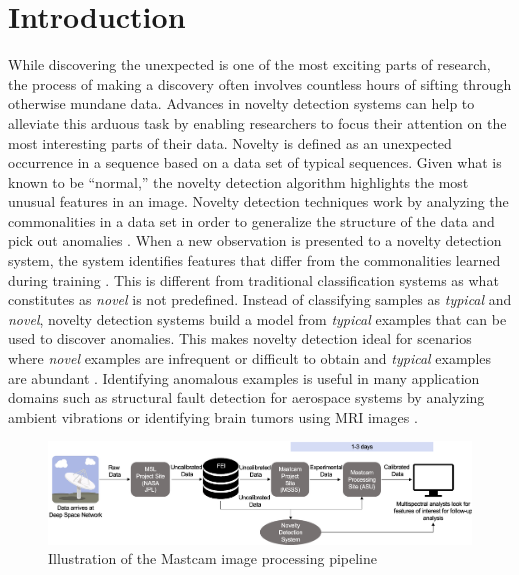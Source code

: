 \section{Introduction}
While discovering the unexpected is one of the most exciting parts of research, the process of making a discovery often involves countless hours of sifting through otherwise mundane data. 
Advances in novelty detection systems can help to alleviate this arduous task by enabling researchers to focus their attention on the most interesting parts of their data. 
Novelty is defined as an unexpected occurrence in a sequence based on a data set of typical sequences.
Given what is known to be “normal,” the novelty detection algorithm highlights the most unusual features in an image. 
Novelty detection techniques work by analyzing the commonalities in a data set in order to generalize the structure of the data and pick out anomalies \parencite{japkowicz1995novelty}.
When a new observation is presented to a novelty detection system, the system identifies features that differ from the commonalities learned during training \parencite{markou2003novelty}.
This is different from traditional classification systems as what constitutes as \textit{novel} is not predefined. 
Instead of classifying samples as \textit{typical} and \textit{novel}, novelty detection systems build a model from \textit{typical} examples that can be used to discover anomalies. 
This makes novelty detection ideal for scenarios where \textit{novel} examples are infrequent or difficult to obtain and \textit{typical} examples are abundant \parencite{japkowicz1995novelty}.
Identifying anomalous examples is useful in many application domains such as structural fault detection for aerospace systems by analyzing ambient vibrations \parencite{worden1997structural} or identifying brain tumors using MRI images \parencite{wang2020brain}.
\begin{figure}
\centering
\includegraphics[width=\linewidth]{figs/msl/DSN.png}
\caption[Mastcam Image Processing Pipeline]{Illustration of the Mastcam image processing pipeline \protect\parencite{kerner2020comparison}}
\label{msl/fig:timeline}
\end{figure}

